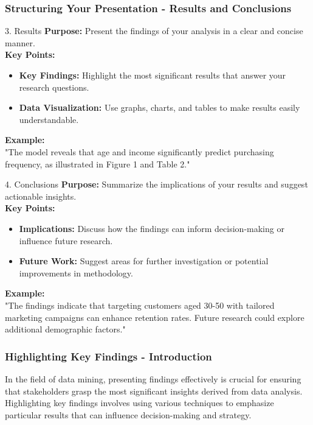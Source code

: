 \documentclass{beamer}
\begin{document}
\begin{frame}[fragile]
    \frametitle{Structuring Your Presentation - Results and Conclusions}
    \begin{block}{3. Results}
        \textbf{Purpose:} Present the findings of your analysis in a clear and concise manner. 
        \\ \textbf{Key Points:}
        \begin{itemize}
            \item \textbf{Key Findings:} Highlight the most significant results that answer your research questions.
            \item \textbf{Data Visualization:} Use graphs, charts, and tables to make results easily understandable.
        \end{itemize}
        \textbf{Example:} 
        \\ "The model reveals that age and income significantly predict purchasing frequency, as illustrated in Figure 1 and Table 2."
    \end{block}

    \begin{block}{4. Conclusions}
        \textbf{Purpose:} Summarize the implications of your results and suggest actionable insights. 
        \\ \textbf{Key Points:}
        \begin{itemize}
            \item \textbf{Implications:} Discuss how the findings can inform decision-making or influence future research.
            \item \textbf{Future Work:} Suggest areas for further investigation or potential improvements in methodology.
        \end{itemize}
        \textbf{Example:} 
        \\ "The findings indicate that targeting customers aged 30-50 with tailored marketing campaigns can enhance retention rates. Future research could explore additional demographic factors."
    \end{block}
\end{frame}

\begin{frame}[fragile]
    \frametitle{Highlighting Key Findings - Introduction}
    In the field of data mining, presenting findings effectively is crucial for ensuring that stakeholders grasp the most significant insights derived from data analysis. 
    Highlighting key findings involves using various techniques to emphasize particular results that can influence decision-making and strategy.
\end{frame}
\end{document}
